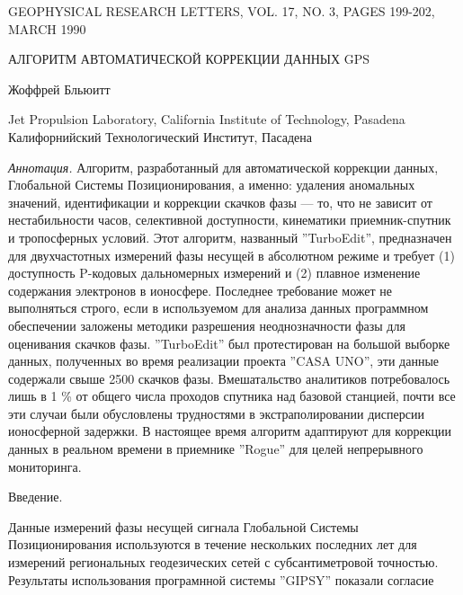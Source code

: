 \documentclass[12pt,a4paper]{article}
\begin{document}
GEOPHYSICAL RESEARCH LETTERS, VOL. 17, NO. 3, PAGES 199-202, MARCH 1990

АЛГОРИТМ АВТОМАТИЧЕСКОЙ КОРРЕКЦИИ ДАННЫХ GPS

Жоффрей Бльюитт

Jet Propulsion Laboratory, California Institute of Technology, Pasadena
Калифорнийский Технологический Институт, Пасадена

\emph{Аннотация.} Алгоритм, разработанный для автоматической коррекции данных,
Глобальной Системы Позиционирования, а именно: удаления аномальных значений, 
идентификации и коррекции скачков фазы --- то, что не зависит от нестабильности
часов, селективной доступности, кинематики приемник-спутник и тропосферных
условий. Этот алгоритм, названный ''TurboEdit'', предназначен для двухчастотных
измерений фазы несущей в абсолютном режиме и требует (1) доступность P-кодовых 
дальномерных измерений и (2) плавное изменение содержания электронов в 
ионосфере. Последнее требование может не выполняться строго, если в 
используемом для анализа данных программном обеспечении заложены методики 
разрешения неоднозначности фазы для оценивания скачков фазы. ''TurboEdit''
был протестирован на большой выборке данных, полученных во время реализации
проекта ''CASA UNO'', эти данные содержали свыше 2500 скачков фазы.
Вмешатальство аналитиков потребовалось лишь в 1 \% от общего числа проходов
спутника над базовой станцией, почти все эти случаи были обусловлены
трудностями в экстраполировании дисперсии ионосферной задержки. В настоящее
время алгоритм адаптируют для коррекции данных в реальном времени в приемнике
''Rogue'' для целей непрерывного мониторинга.

Введение.

Данные измерений фазы несущей сигнала Глобальной Системы Позиционирования
используются в течение нескольких последних лет для измерений региональных
геодезических сетей с субсантиметровой точностью. Результаты использования
програмнной системы ''GIPSY'' показали согласие 
\end{document}
